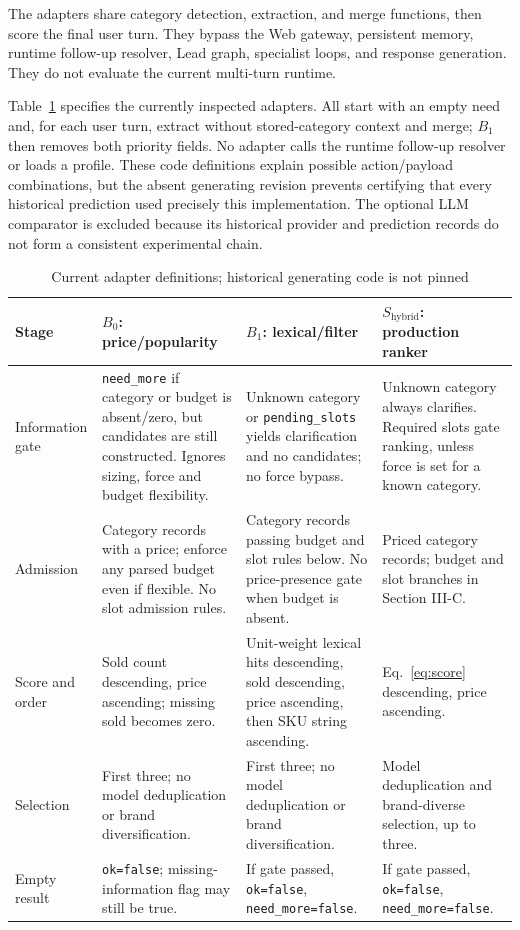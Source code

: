\documentclass[conference,a4paper]{IEEEtran}
\newcommand{\sys}{S_{\mathrm{hybrid}}}
\newcommand{\code}[1]{\texttt{#1}}
\begin{document}
The adapters share category detection, extraction, and merge functions, then score the final user turn. They bypass the Web gateway, persistent memory, runtime follow-up resolver, Lead graph, specialist loops, and response generation. They do not evaluate the current multi-turn runtime.

Table~\ref{tab:policies} specifies the currently inspected adapters. All start with an empty need and, for each user turn, extract without stored-category context and merge; $B_1$ then removes both priority fields. No adapter calls the runtime follow-up resolver or loads a profile. These code definitions explain possible action/payload combinations, but the absent generating revision prevents certifying that every historical prediction used precisely this implementation. The optional LLM comparator is excluded because its historical provider and prediction records do not form a consistent experimental chain.

\begin{table}[t]
\caption{Current adapter definitions; historical generating code is not pinned}
\label{tab:policies}
\centering\footnotesize
\begin{tabularx}{\textwidth}{@{}p{1.8cm}XXX@{}}
\toprule
Stage & $B_0$: price/popularity & $B_1$: lexical/filter & $\sys$: production ranker\\
\midrule
Information gate & \code{need\_more} if category or budget is absent/zero, but candidates are still constructed. Ignores sizing, force and budget flexibility. & Unknown category or \code{pending\_slots} yields clarification and no candidates; no force bypass. & Unknown category always clarifies. Required slots gate ranking, unless force is set for a known category.\\
Admission & Category records with a price; enforce any parsed budget even if flexible. No slot admission rules. & Category records passing budget and slot rules below. No price-presence gate when budget is absent. & Priced category records; budget and slot branches in Section III-C.\\
Score and order & Sold count descending, price ascending; missing sold becomes zero. & Unit-weight lexical hits descending, sold descending, price ascending, then SKU string ascending. & Eq.~\eqref{eq:score} descending, price ascending.\\
Selection & First three; no model deduplication or brand diversification. & First three; no model deduplication or brand diversification. & Model deduplication and brand-diverse selection, up to three.\\
Empty result & \code{ok=false}; missing-information flag may still be true. & If gate passed, \code{ok=false}, \code{need\_more=false}. & If gate passed, \code{ok=false}, \code{need\_more=false}.\\
\bottomrule
\end{tabularx}
\end{table}
\end{document}
